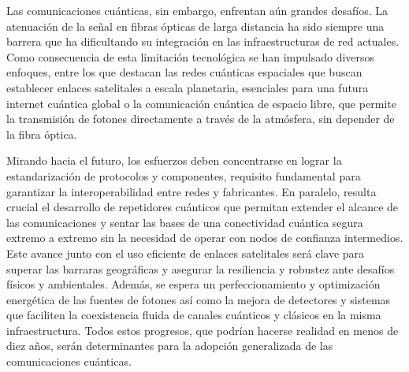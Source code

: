 Las comunicaciones cuánticas, sin embargo, enfrentan aún grandes desafíos. La atenuación de la señal en fibras ópticas de larga distancia ha sido siempre una barrera que ha dificultando su integración en las infraestructuras de red actuales. Como consecuencia de esta limitación tecnológica se han impulsado diversos enfoques, entre los que destacan las redes cuánticas espaciales que buscan establecer enlaces satelitales a escala planetaria, esenciales para una futura internet cuántica global o la comunicación cuántica de espacio libre, que permite la transmisión de fotones directamente a través de la atmósfera, sin depender de la fibra óptica.
		
Mirando hacia el futuro, los esfuerzos deben concentrarse en lograr la estandarización de protocolos y componentes, requisito fundamental para garantizar la interoperabilidad entre redes y fabricantes. En paralelo, resulta crucial el desarrollo de repetidores cuánticos que permitan extender el alcance de las comunicaciones y sentar las bases de una conectividad cuántica segura extremo a extremo sin la necesidad de operar con nodos de confianza intermedios. Este avance junto con el uso eficiente de enlaces satelitales será clave para superar las barraras geográficas y asegurar la resiliencia y robustez ante desafíos físicos y ambientales. Además, se espera un perfeccionamiento y optimización energética de las fuentes de fotones así como la mejora de detectores y sistemas que faciliten la coexistencia fluida de canales cuánticos y clásicos en la misma infraestructura. Todos estos progresos, que podrían hacerse realidad en menos de diez años, serán determinantes para la adopción generalizada de las comunicaciones cuánticas.
